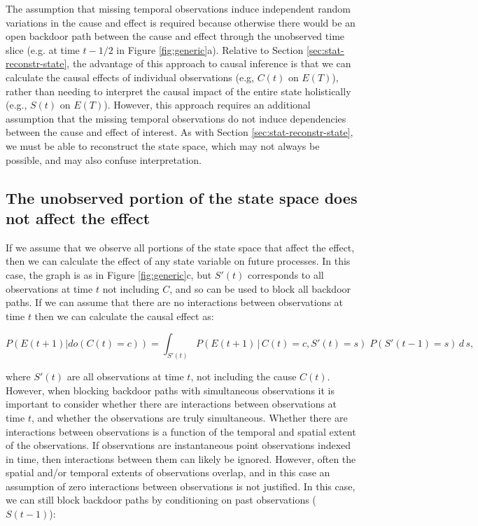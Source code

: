 \documentclass[12pt]{article}
\begin{document}
The assumption that missing temporal observations induce independent
random variations in the cause and effect is required because
otherwise there would be an open backdoor path between the cause and
effect through the unobserved time slice (e.g. at time $t-1/2$ in
Figure \ref{fig:generic}a). Relative to Section
\ref{sec:stat-reconstr-state}, the advantage of this approach to
causal inference is that we can calculate the causal effects of
individual observations (e.g, $C(t)$ on $E(T)$), rather than needing
to interpret the causal impact of the entire state holistically (e.g.,
$S(t)$ on $E(T)$). However, this approach requires an additional
assumption that the missing temporal observations do not induce
dependencies between the cause and effect of interest. As with Section
\ref{sec:stat-reconstr-state}, we must be able to reconstruct the
state space, which may not always be possible, and may also confuse
interpretation.


\subsection{The unobserved portion of the state space does not affect
  the effect}
\label{sec:observ-port-state}

If we assume that we observe all portions of the state space that
affect the effect, then we can calculate the effect of any state
variable on future processes. In this case, the graph is as in Figure
\ref{fig:generic}c, but $S'(t)$ corresponds to all observations at
time $t$ not including $C$, and so can be used to block all backdoor
paths. If we can assume that there are no interactions between
observations at time $t$ then we can calculate the causal effect as:

\begin{equation}
  P(E(t+1)| do(C(t)=c)) = \int_{S'(t)} P(E(t+1) \, | \, C(t)=c,
  S'(t) = s
  )\; P(S'(t-1)=s) \, d \, s,
\end{equation}

where $S'(t)$ are all observations at time $t$, not including the
cause $C(t)$. However, when blocking backdoor paths with simultaneous
observations it is important to consider whether there are
interactions between observations at time $t$, and whether the
observations are truly simultaneous. Whether there are interactions
between observations is a function of the temporal and spatial extent
of the observations. If observations are instantaneous point
observations indexed in time, then interactions between them can
likely be ignored. However, often the spatial and/or temporal extents
of observations overlap, and in this case an assumption of zero
interactions between observations is not justified. In this case, we
can still block backdoor paths by conditioning on past observations
($S(t-1)$):
\end{document}
